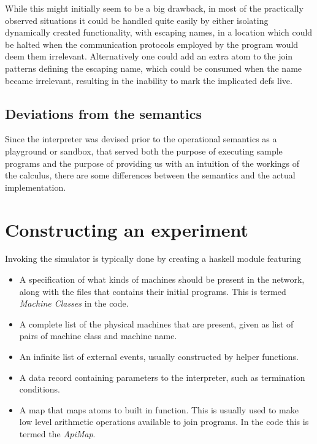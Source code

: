 While this might initially seem to be a big drawback, in most of the practically
observed situations it could be handled quite easily by either isolating
dynamically created functionality, with escaping names, in a location which
could be halted when the communication protocols employed by the program would
deem them irrelevant.  Alternatively one could add an extra atom to the join
patterns defining the escaping name, which could be consumed when the name
became irrelevant, resulting in the inability to mark the implicated defs live.

\subsection*{Deviations from the semantics}
Since the interpreter was devised prior to the operational semantics as a
playground or sandbox, that served both the purpose of executing sample programs
and the purpose of providing us with an intuition of the workings of the
calculus, there are some differences between the semantics and the actual
implementation.

\section{Constructing an experiment}
Invoking the simulator is typically done by creating a haskell module featuring
\begin{itemize}

\item A specification of what kinds of machines should be present in the
network, along with the files that contains their initial programs. This is
termed \emph{Machine Classes} in the code.

\item A complete list of the physical machines that are present, given as list
of pairs of machine class and machine name.

\item An infinite list of external events, usually constructed by helper
functions.

\item A data record containing parameters to the interpreter, such as
termination conditions.

\item A map that maps atoms to built in function. This is usually used to make
low level arithmetic operations available to join programs. In the code this is
termed the \emph{ApiMap}.

\end{itemize}
